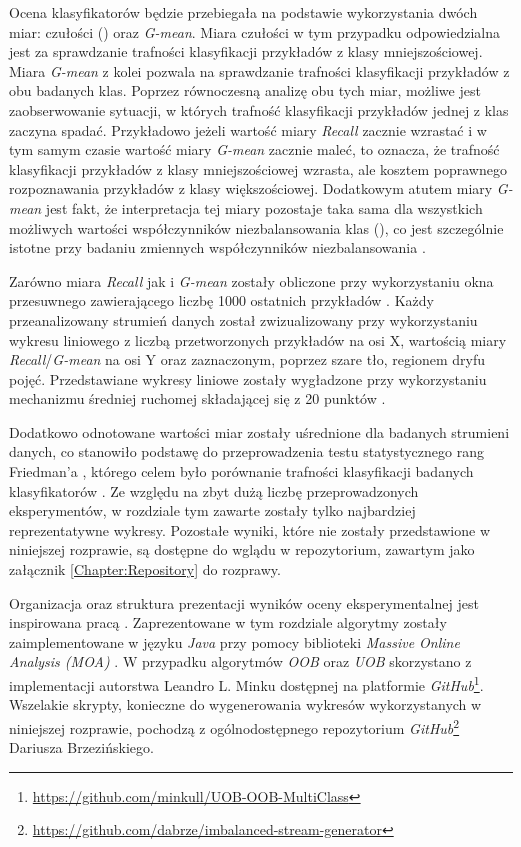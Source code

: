 Ocena klasyfikatorów będzie przebiegała na podstawie wykorzystania dwóch miar: czułości () oraz \textit{G-mean}. Miara czułości w tym przypadku odpowiedzialna jest za sprawdzanie trafności klasyfikacji przykładów z klasy mniejszościowej. Miara \textit{G-mean} z kolei pozwala na sprawdzanie trafności klasyfikacji przykładów z obu badanych klas. Poprzez równoczesną analizę obu tych miar, możliwe jest zaobserwowanie sytuacji, w których trafność klasyfikacji przykładów jednej z klas zaczyna spadać. Przykładowo jeżeli wartość miary \textit{Recall} zacznie wzrastać i w tym samym czasie wartość miary \textit{G-mean} zacznie maleć, to oznacza, że trafność klasyfikacji przykładów z klasy mniejszościowej wzrasta, ale kosztem poprawnego rozpoznawania przykładów z klasy większościowej. Dodatkowym atutem miary \textit{G-mean} jest fakt, że interpretacja tej miary pozostaje taka sama dla wszystkich możliwych wartości współczynników niezbalansowania klas (), co jest szczególnie istotne przy badaniu zmiennych współczynników niezbalansowania \cite{Article:TypyPrzykladow}.

Zarówno miara \textit{Recall} jak i \textit{G-mean} zostały obliczone przy wykorzystaniu okna przesuwnego zawierającego liczbę 1000 ostatnich przykładów \cite{Article:Evaluation}. Każdy przeanalizowany strumień danych został zwizualizowany przy wykorzystaniu wykresu liniowego z liczbą przetworzonych przykładów na osi X, wartością miary \textit{Recall}/\textit{G-mean} na osi Y oraz zaznaczonym, poprzez szare tło, regionem dryfu pojęć. Przedstawiane wykresy liniowe zostały wygładzone przy wykorzystaniu mechanizmu średniej ruchomej składającej się z 20 punktów \cite{Article:TypyPrzykladow}.

Dodatkowo odnotowane wartości miar zostały uśrednione dla badanych strumieni danych, co stanowiło podstawę do przeprowadzenia testu statystycznego rang Friedman'a \cite{Article:Friedman}, którego celem było porównanie trafności klasyfikacji badanych klasyfikatorów \cite{Article:TypyPrzykladow}. Ze względu na zbyt dużą liczbę przeprowadzonych eksperymentów, w rozdziale tym zawarte zostały tylko najbardziej reprezentatywne wykresy. Pozostałe wyniki, które nie zostały przedstawione w niniejszej rozprawie, są dostępne do wglądu w repozytorium, zawartym jako załącznik \ref{Chapter:Repository} do rozprawy.

Organizacja oraz struktura prezentacji wyników oceny eksperymentalnej jest inspirowana pracą \cite{Article:TypyPrzykladow}. Zaprezentowane w tym rozdziale algorytmy zostały zaimplementowane w języku \textit{Java} przy pomocy biblioteki \textit{Massive Online Analysis (MOA)} \cite{Article:MOA}. W przypadku algorytmów \textit{OOB} oraz \textit{UOB} skorzystano z implementacji autorstwa Leandro L. Minku dostępnej na platformie \textit{GitHub}\footnote{\url{https://github.com/minkull/UOB-OOB-MultiClass}}. Wszelakie skrypty, konieczne do wygenerowania wykresów wykorzystanych w niniejszej rozprawie, pochodzą z ogólnodostępnego repozytorium \textit{GitHub}\footnote{\url{https://github.com/dabrze/imbalanced-stream-generator}} Dariusza Brzezińskiego.

